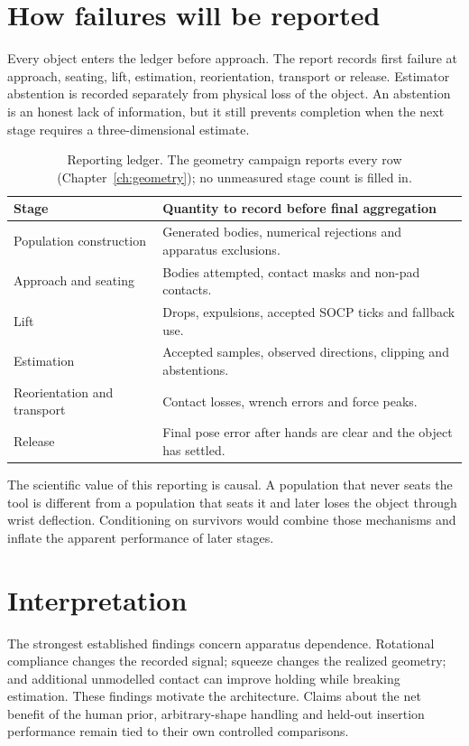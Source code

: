 \section{How failures will be reported}

Every object enters the ledger before approach. The report records first failure at approach, seating, lift, estimation, reorientation, transport or release. Estimator abstention is recorded separately from physical loss of the object. An abstention is an honest lack of information, but it still prevents completion when the next stage requires a three-dimensional estimate.

\begin{table}[htbp]\centering\small
\begin{tabular}{@{}lp{}@{}}\toprule
Stage & Quantity to record before final aggregation\\
\midrule
Population construction & Generated bodies, numerical rejections and apparatus exclusions.\\
Approach and seating & Bodies attempted, contact masks and non-pad contacts.\\
Lift & Drops, expulsions, accepted SOCP ticks and fallback use.\\
Estimation & Accepted samples, observed directions, clipping and abstentions.\\
Reorientation and transport & Contact losses, wrench errors and force peaks.\\
Release & Final pose error after hands are clear and the object has settled.\\
\bottomrule\end{tabular}
\caption{Reporting ledger. The geometry campaign reports every row (Chapter~\ref{ch:geometry}); no unmeasured stage count is filled in.}
\label{tab:mortality-protocol}
\end{table}

The scientific value of this reporting is causal. A population that never seats the tool is different from a population that seats it and later loses the object through wrist deflection. Conditioning on survivors would combine those mechanisms and inflate the apparent performance of later stages.

\section{Interpretation}

The strongest established findings concern apparatus dependence. Rotational compliance changes the recorded signal; squeeze changes the realized geometry; and additional unmodelled contact can improve holding while breaking estimation. These findings motivate the architecture. Claims about the net benefit of the human prior, arbitrary-shape handling and held-out insertion performance remain tied to their own controlled comparisons.


